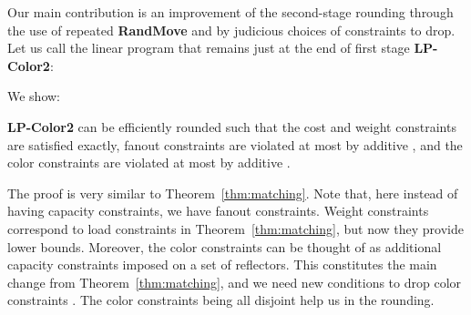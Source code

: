 Our main contribution is an improvement of the second-stage rounding
through the use of repeated \textbf{RandMove} and by judicious choices of
constraints to drop. Let us call the linear program that remains just at the end of first stage \textbf{LP-Color2}:



We show:

\begin{lemma}
\label{lem:color}
\textbf{LP-Color2} can be efficiently rounded such that the cost and weight constraints are satisfied exactly, fanout constraints are violated at most by additive , and the color constraints are violated at most by additive .
\end{lemma}

The proof is very similar to Theorem~\ref{thm:matching}. Note that, here instead of having capacity constraints, we have fanout constraints. Weight constraints correspond to load constraints in Theorem~\ref{thm:matching}, but now they provide lower bounds. Moreover, the color constraints can be thought of as additional capacity constraints imposed on a set of reflectors. This constitutes the main change from Theorem~\ref{thm:matching}, and we need new conditions to drop color constraints . The color constraints being all disjoint help us in the rounding.

